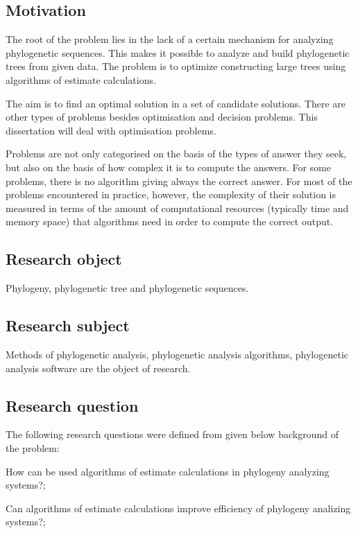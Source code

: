 \subsection*{Motivation}
The root of the problem lies in the lack of a certain mechanism 
for analyzing phylogenetic sequences. This makes it possible to 
analyze and build phylogenetic trees from given data. The problem 
is to optimize constructing large trees using 
algorithms of estimate calculations.

The aim is to find an optimal solution in a set of candidate solutions. 
There are other types of problems besides optimisation and decision problems. 
This dissertation will deal with optimisation problems.

Problems are not only categorised on the basis of the types of 
answer they seek, but also on the basis of how complex it is to 
compute the answers. For some problems, there is no algorithm 
giving always the correct answer. For most of the problems 
encountered in practice, however, the complexity of their 
solution is measured in terms of the amount of computational 
resources (typically time and memory space) that algorithms need 
in order to compute the correct output.

\subsection*{Research object}
Phylogeny, phylogenetic tree and phylogenetic sequences.

\subsection*{Research subject}
Methods of phylogenetic analysis, phylogenetic analysis algorithms, 
phylogenetic analysis software are the object of research. 

\subsection*{Research question} 

The following research questions were defined from given below 
background of the problem:

How can be used algorithms of estimate calculations in phylogeny 
analyzing systems?;

Can algorithms of estimate calculations improve efficiency of phylogeny 
analizing systems?;

